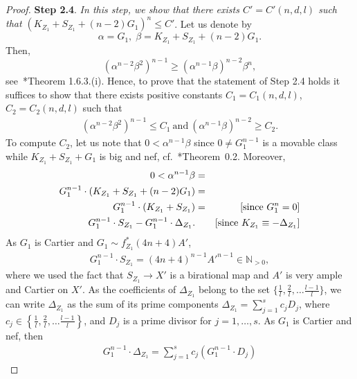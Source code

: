 \documentclass[11pt]{ip-journal}
\theoremstyle{definition}
\begin{document}
\begin{proof}
{\bf Step 2.4}. 
{\it In this step, we show that there exists $C'=C'(n, d, l)$ such that $(K_{Z_1}+ S_{Z_1}+(n-2)G_1)^n \leq C'$}.
\newline
Let us denote by 
\[
\alpha = G_1, \; \beta=K_{Z_1}+S_{Z_1}+(n-2)G_1. 
\]
Then, 
\[
(\alpha^{n-2} \beta^2)^{n-1} \geq (\alpha^{n-1} \beta)^{n-2} \beta^{n},
\]
see~\cite{MR2095471}*{Theorem 1.6.3.(i)}.
Hence, to prove that the statement of Step 2.4 holds it suffices to show that there exists positive constants $C_1=C_1(n, d, l)$, $C_2=C_2(n, d, l)$ such that 
\begin{align*}
(\alpha^{n-2} \beta^2)^{n-1} \leq C_1 \ 
\text{and} \
(\alpha^{n-1} \beta)^{n-2} \geq C_2.
\end{align*}
To compute $C_2$, let us note that $0< \alpha^{n-1} \beta$ since $0 \neq G_1^{n-1}$ is a movable class while $K_{Z_1}+S_{Z_1}+G_1$ is big and nef, cf.~\cite{MR3019449}*{Theorem~0.2}.
Moreover,
\begin{align}
\label{eqn.alpha.beta.1}
\nonumber
0< \alpha^{n-1} \beta &= \\ 
\nonumber
G_1^{n-1} \cdot (K_{Z_1}+S_{Z_1}+(n-2) G_1) &= \\
G_1^{n-1} \cdot (K_{Z_1}+S_{Z_1}) &= & 
\hfill[\text{since } G_1^{n}=0]\\
\nonumber
G_1^{n-1} \cdot S_{Z_1} - G_1^{n-1} \cdot \Delta_{Z_1}. & &
\hfill[\text{since } K_{Z_1} \equiv -\Delta_{Z_1}]
\end{align}
As $G_1$ is Cartier and $G_1 \sim f^\ast_{Z_1} (4n+4)A'$,
\begin{align}
\label{eqn.alpha.beta.2}
G_1^{n-1} \cdot S_{Z_1} = 
(4n+4)^{n-1}A'^{n-1} \in \mathbb{N}_{>0},
\end{align}
where we used the fact that $S_{Z_1} \to X'$ is a birational map and $A'$ is very ample and Cartier on $X'$.
As the coefficients of $\Delta_{Z_1}$ belong to the set $\{ \frac 1 l, \frac 2 l, \dots \frac{l-1}{l}\}$, we can write $\Delta_{Z_1}$ as the sum of its prime components
$\Delta_{Z_1} = \sum_{j=1}^s c_j D_j$, 
where 
$c_j \in \left\{ \frac 1 l, \frac 2 l, \dots \frac{l-1}{l}\right\}$, 
and 
$D_j$ 
is a prime divisor for
$j=1, \dots, s$.
\newline
As $G_1$ is Cartier and nef, then
\begin{align}
\label{eqn.alpha.beta.3}
G_1^{n-1} \cdot \Delta_{Z_1} = 
\sum_{j=1}^s c_j (G_1^{n-1} \cdot D_j) 

\end{align}
\end{proof}
\end{document}
